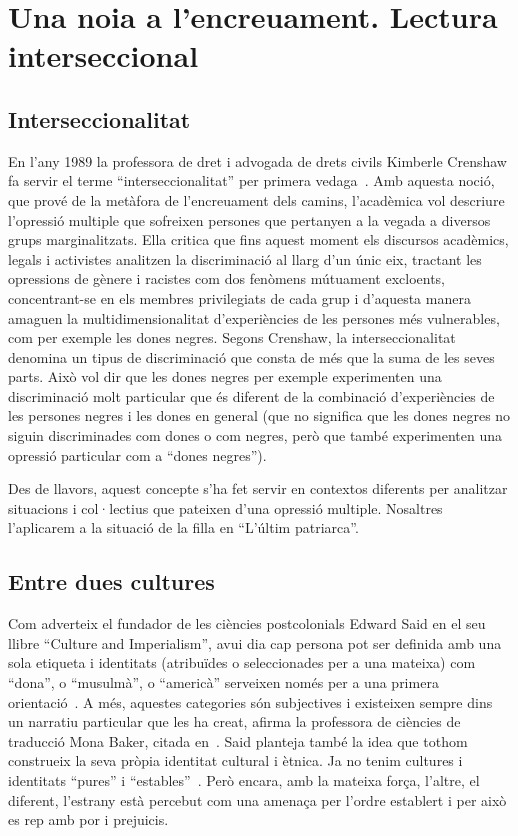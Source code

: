 \section{Una noia a l'encreuament. Lectura interseccional}

\subsection{Interseccionalitat}

En l'any 1989 la professora de dret i advogada de drets civils Kimberle Crenshaw fa servir el terme ``interseccionalitat'' per primera vedaga~\autocite{Crenshaw1989}.
Amb aquesta noció, que prové de la metàfora de l'encreuament dels camins, l'acadèmica vol descriure l'opressió multiple que sofreixen persones que pertanyen a la vegada a diversos grups marginalitzats.
Ella critica que fins aquest moment els discursos acadèmics, legals i activistes analitzen la discriminació al llarg d'un únic eix,
tractant les opressions de gènere i racistes com dos fenòmens mútuament excloents,
concentrant-se en els membres privilegiats de cada grup i d'aquesta manera amaguen la multidimensionalitat d'experiències de les persones més vulnerables, com per exemple les dones negres.
Segons Crenshaw, la interseccionalitat denomina un tipus de discriminació que consta de més que la suma de les seves parts.
Això vol dir que les dones negres per exemple experimenten una discriminació molt particular que és diferent de la combinació d'experiències de les persones negres i les dones en general (que no significa que les dones negres no siguin discriminades com dones o com negres, però que també experimenten una opressió particular com a ``dones negres'').

Des de llavors, aquest concepte s'ha fet servir en contextos diferents per analitzar situacions i col·lectius que pateixen d'una opressió multiple.
Nosaltres l'aplicarem a la situació de la filla en ``L'últim patriarca''.

\subsection{Entre dues cultures}

Com adverteix el fundador de les ciències postcolonials Edward Said en el seu llibre ``Culture and Imperialism'', avui dia cap persona pot ser definida amb una sola etiqueta
i identitats (atribuïdes o seleccionades per a una mateixa) com ``dona'', o ``musulmà'', o ``americà'' serveixen només per a una primera orientació~\autocite{Vidal2012}.
A més, aquestes categories són subjectives i existeixen sempre dins un narratiu particular que les ha creat, afirma la professora de ciències de traducció Mona Baker, citada en~\autocite{Vidal2012}.
Said planteja també la idea que tothom construeix la seva pròpia identitat cultural i ètnica.
Ja no tenim cultures i identitats ``pures'' i ``estables''~\autocite{Vidal2012}.
Però encara, amb la mateixa força, l'altre, el diferent, l'estrany està percebut com una amenaça per l'ordre establert i per això es rep amb por i prejuicis.

